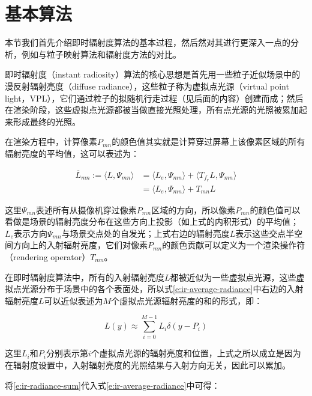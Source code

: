 \section{基本算法}
本节我们首先介绍即时辐射度算法的基本过程，然后然对其进行更深入一点的分析，例如与粒子映射算法和辐射度方法的对比。

即时辐射度（instant radiosity）算法\cite{a:InstantRadiosity}的核心思想是首先用一些粒子近似场景中的漫反射辐射亮度（diffuse radiance），这些粒子称为虚拟点光源（virtual point light，VPL），它们通过粒子的拟随机行走过程（见后面的内容）创建而成；然后在渲染阶段，这些虚拟点光源都被当做直接光照处理，所有点光源的光照被累加起来形成最终的光照。

在渲染方程中，计算像素$P_{mn}$的颜色值其实就是计算穿过屏幕上该像素区域的所有辐射亮度的平均值，这可以表述为：

\begin{equation}\label{e:ir-average-radiance}
\begin{aligned}
	\overline{L}_{mn}:=\langle L,\Psi_{mn}\rangle &=\langle L_e,\Psi_{mn}\rangle +\langle T_{f_r}L,\Psi_{mn}\rangle \\
	&=\langle L_e,\Psi_{mn}\rangle+T_{mn}L
\end{aligned}
\end{equation}

\noindent 这里$\Psi_{mn}$表述所有从摄像机穿过像素$P_{mn}$区域的方向，所以像素$P_{mn}$的颜色值可以看做是场景的辐射亮度分布在这些方向上投影（如上式的内积形式）的平均值；$L_e$表示方向$\Psi_{mn}$与场景交点处的自发光；上式右边的辐射亮度$L$表示这些交点半空间方向上的入射辐射亮度，它们对像素$P_{mn}$的颜色贡献可以定义为一个渲染操作符（rendering operator）$T_{mn}$。

在即时辐射度算法中，所有的入射辐射亮度$L$都被近似为一些虚拟点光源，这些虚拟点光源分布于场景中的各个表面处，所以式\ref{e:ir-average-radiance}中右边的入射辐射亮度$L$可以近似表述为$M$个虚拟点光源辐射亮度的和的形式，即：

\begin{equation}\label{e:ir-radiance-sum}
	L(y)\approx\sum^{M-1}_{i=0}L_i\delta(y-P_i)
\end{equation}

\noindent 这里$L_i$和$P_i$分别表示第$i$个虚拟点光源的辐射亮度和位置，上式之所以成立是因为在辐射度设置中，入射辐射亮度的光照结果与入射方向无关，因此可以累加。

将\ref{e:ir-radiance-sum}代入式\ref{e:ir-average-radiance}中可得：


